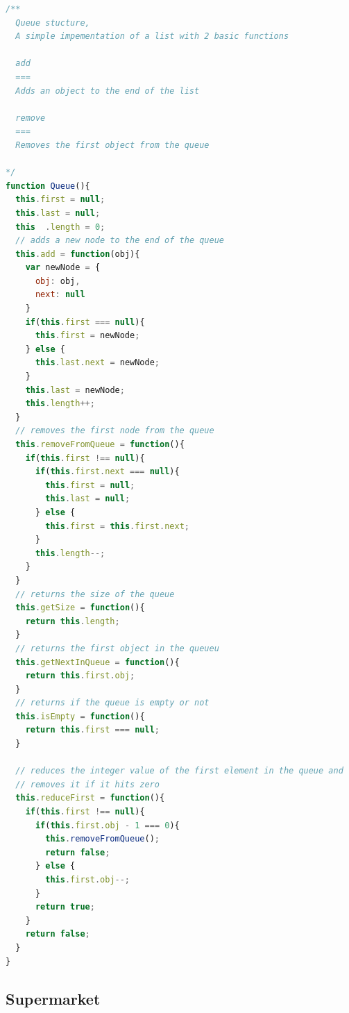 \documentclass[pdftex,a4paper,10pt,titlepage]{article}
\begin{document}
\begin{lstlisting}[language=JavaScript]
/**
  Queue stucture,
  A simple impementation of a list with 2 basic functions
  
  add
  ===
  Adds an object to the end of the list
  
  remove
  ===
  Removes the first object from the queue

*/
function Queue(){
  this.first = null;
  this.last = null;
  this  .length = 0;
  // adds a new node to the end of the queue
  this.add = function(obj){
    var newNode = {
      obj: obj,
      next: null
    }
    if(this.first === null){
      this.first = newNode;
    } else {
      this.last.next = newNode;
    }
    this.last = newNode;
    this.length++;
  }
  // removes the first node from the queue
  this.removeFromQueue = function(){
    if(this.first !== null){
      if(this.first.next === null){
        this.first = null;
        this.last = null;
      } else {
        this.first = this.first.next;
      }
      this.length--;
    }
  }
  // returns the size of the queue
  this.getSize = function(){
    return this.length;
  }
  // returns the first object in the queueu
  this.getNextInQueue = function(){
    return this.first.obj;
  }
  // returns if the queue is empty or not
  this.isEmpty = function(){
    return this.first === null;
  }

  // reduces the integer value of the first element in the queue and
  // removes it if it hits zero
  this.reduceFirst = function(){
    if(this.first !== null){
      if(this.first.obj - 1 === 0){
        this.removeFromQueue();
        return false;
      } else {
        this.first.obj--;
      }
      return true;
    }
    return false;
  }
}
\end{lstlisting}

\pagebreak

\subsection{Supermarket}
\end{document}
